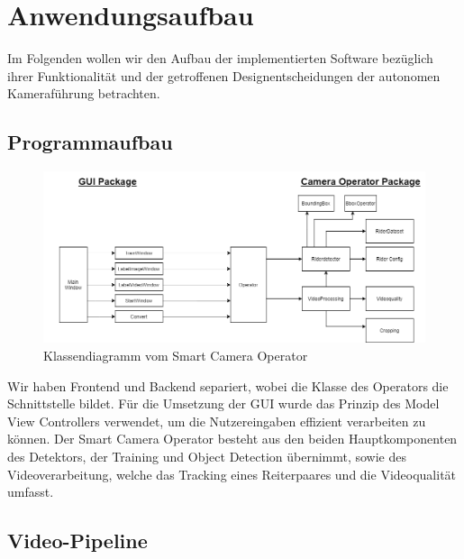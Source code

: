 \chapter{Anwendungsaufbau}
\label{ch:anwendungsaufbau}
Im Folgenden wollen wir den Aufbau der implementierten Software bezüglich ihrer Funktionalität und der getroffenen Designentscheidungen der autonomen Kameraführung betrachten. 
\section{Programmaufbau}
\begin{figure}[h]
\includegraphics[width=\textwidth]{./img/Klassendiagramm.png}
\caption{Klassendiagramm vom Smart Camera Operator}
\label{fig:Klassendiagramm}
\end{figure}
Wir haben Frontend und Backend separiert, wobei die Klasse des Operators die Schnittstelle bildet. Für die Umsetzung der GUI wurde das Prinzip des Model View Controllers verwendet, um die Nutzereingaben effizient verarbeiten zu können. Der Smart Camera Operator besteht aus den beiden Hauptkomponenten des Detektors, der Training und Object Detection übernimmt, sowie des Videoverarbeitung, welche das Tracking eines Reiterpaares und die Videoqualität umfasst.

\newpage

\section{Video-Pipeline}

